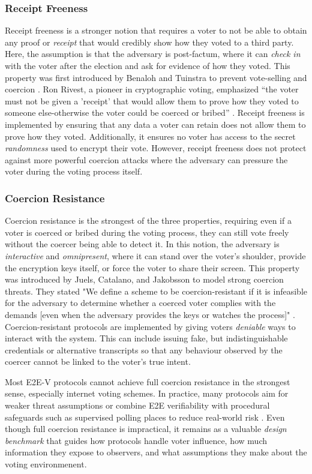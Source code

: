 \subsubsection{Receipt Freeness}
Receipt freeness is a stronger notion that requires a voter to not be able to obtain any proof or \emph{receipt} that would credibly show how they voted to a third party.
Here, the assumption is that the adversary is post-factum, where it can \emph{check in} with the voter after the election and ask for evidence of how they voted. 
This property was first introduced by Benaloh and Tuinstra to prevent vote-selling and coercion \cite{BT94}.
Ron Rivest, a pioneer in cryptographic voting, emphasized ``the voter must not be given a 'receipt' that would allow them to prove how they voted to someone else-otherwise the voter could be coerced or bribed'' \cite{RS07}.
Receipt freeness is implemented by ensuring that any data a voter can retain does not allow them to prove how they voted.
Additionally, it ensures no voter has access to the secret \emph{randomness} used to encrypt their vote. 
However, receipt freeness does not protect against more powerful coercion attacks where the adversary can pressure the voter during the voting process itself.

\subsubsection{Coercion Resistance}
Coercion resistance is the strongest of the three properties, requiring even if a voter is coerced or bribed during the voting process, they can still vote freely without the coercer being able to detect it.
In this notion, the adversary is \emph{interactive} and \emph{omnipresent}, where it can stand over the voter's shoulder, provide the encryption keys itself, or force the voter to share their screen.
This property was introduced by Juels, Catalano, and Jakobsson to model strong coercion threats.
They stated "We define a scheme to be coercion-resistant if it is infeasible for the adversary to determine whether a coerced voter complies with the demands [even when the adversary provides the keys or watches the process]" \cite{haines2019surveying}.
Coercion-resistant protocols are implemented by giving voters \emph{deniable} ways to interact with the system.
This can include issuing fake, but indistinguishable credentials or alternative transcripts so that any behaviour observed by the coercer cannot be linked to the voter's true intent.

Most E2E-V protocols cannot achieve full coercion resistance in the strongest sense, especially internet voting schemes.
In practice, many protocols aim for weaker threat assumptions or combine E2E verifiability with procedural safeguards such as supervised polling places to reduce real-world risk \cite{255242}.
Even though full coercion resistance is impractical, it remains as a valuable \emph{design benchmark} that guides how protocols handle voter influence, how much information they expose to observers, and what assumptions they make about the voting environmenent.


